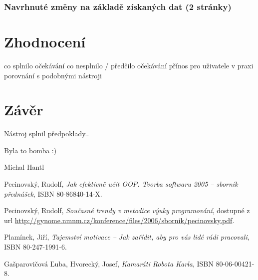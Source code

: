 \documentclass[bc,female,java,dept456]{diploma}						%
\begin{document}
\subsubsection{Navrhnuté změny na základě získaných dat (2 stránky)}


\section{Zhodnocení}
co splnilo očekávání
co nesplnilo / předčilo očekávání
přínos pro uživatele v praxi
porovnání s podobnými nástroji




\section{Závěr}
\label{sec:Conclusion}

Nástroj splnil předpoklady..

Byla to bomba :)

\bigskip
\begin{flushright}
Michal Hantl
\end{flushright}









\begin{thebibliography}{99}


 Pecinovský, Rudolf,
\textit{Jak efektivně učit OOP. Tvorba softwaru 2005 – sborník přednášek}, ISBN 80-86840-14-X.

 Pecinovský, Rudolf,
\textit{Současné trendy v metodice výuky programování}, dostupné z url \url{http://gynome.nmnm.cz/konference/files/2006/sbornik/pecinovsky.pdf}.

 Plamínek, Jiří,
\textit{Tajemství motivace – Jak zařídit, aby pro vás lidé rádi pracovali}, ISBN 80-247-1991-6.

 Gašparovičová Ľuba, Hvorecký, Josef,
\textit{Kamaráti Robota Karla}, ISBN 80-06-00421-8.

\end{thebibliography}


\end{document}

